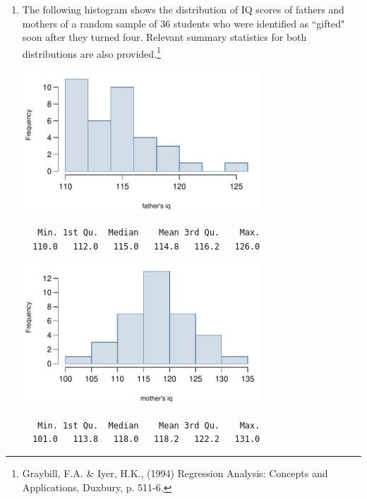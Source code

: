 \documentclass[11pt]{article}
\begin{document}
\begin{enumerate}
\item The following histogram shows the distribution of IQ scores of fathers and mothers of a random sample of 36 students who were identified as ``gifted" soon after they turned four. Relevant summary statistics for both distributions are also provided.\footnote{Graybill, F.A. \& Iyer, H.K., (1994) Regression Analysis: Concepts and Applications, Duxbury, p. 511-6.}

\begin{minipage}[c]{0.5\textwidth}
\begin{center}
\includegraphics[width=0.7\textwidth]{figures/gifted/father_iq_hist}
{\footnotesize
\begin{verbatim}
   Min. 1st Qu.  Median    Mean 3rd Qu.    Max. 
  110.0   112.0   115.0   114.8   116.2   126.0 
\end{verbatim}
}
\end{center}
\end{minipage}
\begin{minipage}[c]{0.5\textwidth}
\begin{center}
\includegraphics[width=0.7\textwidth]{figures/gifted/mother_iq_hist}
\end{center}
{\footnotesize
\begin{verbatim}
   Min. 1st Qu.  Median    Mean 3rd Qu.    Max. 
  101.0   113.8   118.0   118.2   122.2   131.0 
\end{verbatim}
}
\end{minipage}


\end{enumerate}
\end{document}
